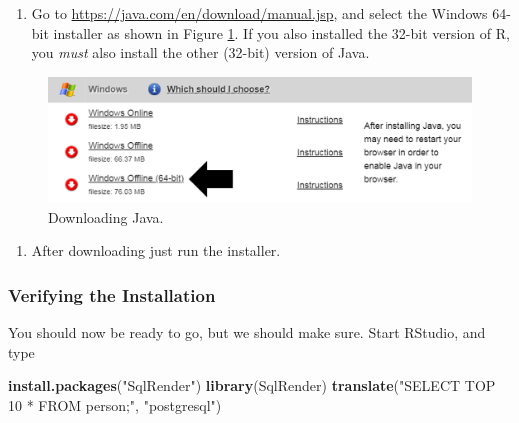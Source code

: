 \documentclass[11pt]{book}
\newenvironment{Shaded}{\begin{snugshade}}{\end{snugshade}}
\newcommand{\KeywordTok}[1]{\textcolor[rgb]{0.13,0.29,0.53}{\textbf{#1}}}
\newcommand{\StringTok}[1]{\textcolor[rgb]{0.31,0.60,0.02}{#1}}
\newcommand{\NormalTok}[1]{#1}
\providecommand{\tightlist}{%
  \setlength{\itemsep}{0pt}\setlength{\parskip}{0pt}}
\theoremstyle{definition}
\theoremstyle{definition}
\theoremstyle{definition}
\theoremstyle{remark}
\begin{document}
\begin{enumerate}
\def\labelenumi{\arabic{enumi}.}
\tightlist
\item
  Go to \url{https://java.com/en/download/manual.jsp}, and select the
  Windows 64-bit installer as shown in Figure \ref{fig:downloadJava}. If
  you also installed the 32-bit version of R, you \emph{must} also
  install the other (32-bit) version of Java.
\end{enumerate}

\begin{figure}

{\centering \includegraphics[width=1\linewidth]{images/OhdsiAnalyticsTools/downloadJava} 

}

\caption{Downloading Java.}\label{fig:downloadJava}
\end{figure}

\begin{enumerate}
\def\labelenumi{\arabic{enumi}.}
\setcounter{enumi}{1}
\tightlist
\item
  After downloading just run the installer.
\end{enumerate}

\subsubsection*{Verifying the
Installation}\label{verifying-the-installation}

You should now be ready to go, but we should make sure. Start RStudio,
and type

\begin{Shaded}
\begin{Highlighting}[]
\KeywordTok{install.packages}\NormalTok{(}\StringTok{"SqlRender"}\NormalTok{)}
\KeywordTok{library}\NormalTok{(SqlRender)}
\KeywordTok{translate}\NormalTok{(}\StringTok{"SELECT TOP 10 * FROM person;"}\NormalTok{, }\StringTok{"postgresql"}\NormalTok{)}
\end{Highlighting}
\end{Shaded}
\end{document}
